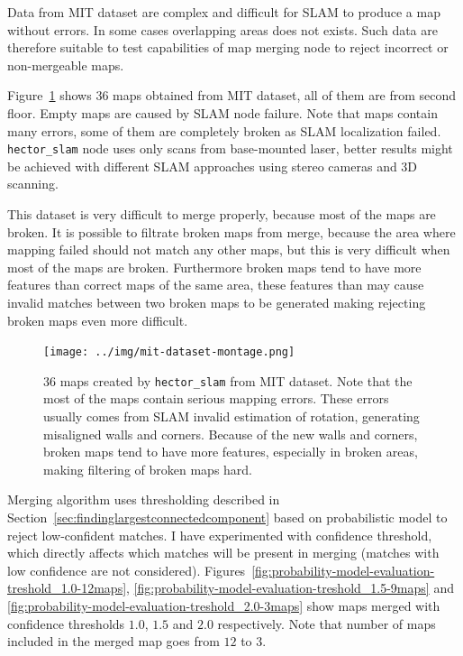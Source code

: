 Data from \gls{MIT} dataset are complex and difficult for \gls{SLAM} to produce a map without errors. In some cases overlapping areas does not exists. Such data are therefore suitable to test capabilities of map merging node to reject incorrect or non-mergeable maps.

Figure~\ref{fig:probability-model-evaluation-montage} shows $36$ maps obtained from \gls{MIT} dataset, all of them are from second floor. Empty maps are caused by \gls{SLAM} node failure. Note that maps contain many errors, some of them are completely broken as \gls{SLAM} localization failed. \texttt{hector\_slam} node uses only scans from base-mounted laser, better results might be achieved with different \gls{SLAM} approaches using stereo cameras and 3D scanning.

This dataset is very difficult to merge properly, because most of the maps are broken. It is possible to filtrate broken maps from merge, because the area where mapping failed should not match any other maps, but this is very difficult when most of the maps are broken. Furthermore broken maps tend to have more features than correct maps of the same area, these features than may cause invalid matches between two broken maps to be generated making rejecting broken maps even more difficult.

\begin{figure}
    \centering
    \texttt{[image: ../img/mit-dataset-montage.png]}
    \caption[$36$ maps created by \texttt{hector\_slam} from \gls{MIT} dataset.]{$36$ maps created by \texttt{hector\_slam} from \gls{MIT} dataset. Note that the most of the maps contain serious mapping errors. These errors usually comes from \gls{SLAM} invalid estimation of rotation, generating misaligned walls and corners. Because of the new walls and corners, broken maps tend to have more features, especially in broken areas, making filtering of broken maps hard.}
    \label{fig:probability-model-evaluation-montage}
\end{figure}

Merging algorithm uses thresholding described in Section~\ref{sec:findinglargestconnectedcomponent} based on probabilistic model to reject low-confident matches. I have experimented with confidence threshold, which directly affects which matches will be present in merging (matches with low confidence are not considered). Figures~\ref{fig:probability-model-evaluation-treshold_1.0-12maps}, \ref{fig:probability-model-evaluation-treshold_1.5-9maps} and \ref{fig:probability-model-evaluation-treshold_2.0-3maps} show maps merged with confidence thresholds $1.0$, $1.5$ and $2.0$ respectively. Note that number of maps included in the merged map goes from $12$ to $3$.


